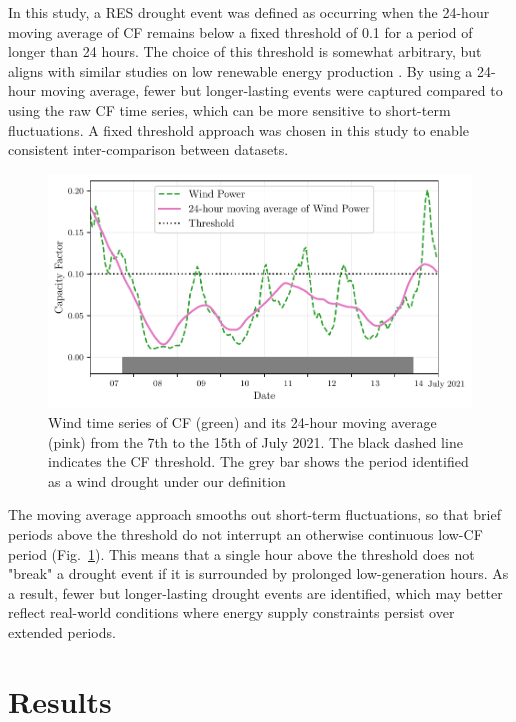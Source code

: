 \documentclass[preprint, 12pt]{elsarticle}
\begin{document}
In this study, a RES drought event was defined as occurring when the 24-hour moving average of CF remains below a fixed threshold of 0.1 for a period of longer than 24 hours. The choice of this threshold is somewhat arbitrary, but aligns with similar studies on low renewable energy production \citep{kaspar2019drought, ohba2022drought, mayer2023drought}. By using a 24-hour moving average, fewer but longer-lasting events were captured compared to using the raw CF time series, which can be more sensitive to short-term fluctuations. A fixed threshold approach was chosen in this study to enable consistent inter-comparison between datasets.

\begin{figure}[ht!]
	\centering
	\includegraphics[width=\textwidth]{droughts_methodology.pdf}
	\caption{Wind time series of CF (green) and its 24-hour moving average (pink) from the 7th to the 15th of July 2021. The black dashed line indicates the CF threshold. The grey bar shows the period identified as a wind drought under our definition}
	\label{fig:find_res_droughts}
\end{figure}

The moving average approach smooths out short-term fluctuations, so that brief periods above the threshold do not interrupt an otherwise continuous low-CF period (Fig.~\ref{fig:find_res_droughts}). This means that a single hour above the threshold does not "break" a drought event if it is surrounded by prolonged low-generation hours. As a result, fewer but longer-lasting drought events are identified, which may better reflect real-world conditions where energy supply constraints persist over extended periods.

\section{Results}
\label{sec:results}
\end{document}
